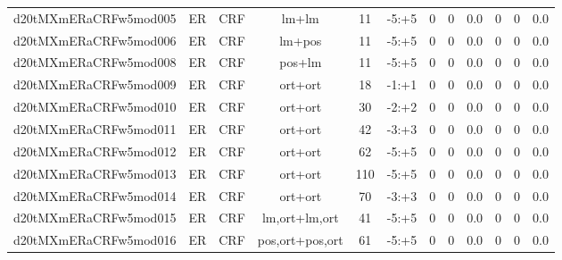 \documentclass[a4paper]{article}
\begin{document}
\begin{landscape}
\begin{center}
\begin{tabular}{ |c|c|c|c|c|c|c|c|c|c|c|c|}
 
 	
 	\small{ d20tMXmERaCRFw5mod005 } & ER & CRF & lm+lm  &  11 &  -5:+5  &  0 & 0 & 0.0  &  0 & 0 & 0.0 \\
 	

 
 	
 	\small{ d20tMXmERaCRFw5mod006 } & ER & CRF & lm+pos  &  11 &  -5:+5  &  0 & 0 & 0.0  &  0 & 0 & 0.0 \\
 	

 
 	
 	\small{ d20tMXmERaCRFw5mod008 } & ER & CRF & pos+lm  &  11 &  -5:+5  &  0 & 0 & 0.0  &  0 & 0 & 0.0 \\
 	

 
 	
 	\small{ d20tMXmERaCRFw5mod009 } & ER & CRF & ort+ort  &  18 &  -1:+1  &  0 & 0 & 0.0  &  0 & 0 & 0.0 \\
 	

 
 	
 	\small{ d20tMXmERaCRFw5mod010 } & ER & CRF & ort+ort  &  30 &  -2:+2  &  0 & 0 & 0.0  &  0 & 0 & 0.0 \\
 	

 
 	
 	\small{ d20tMXmERaCRFw5mod011 } & ER & CRF & ort+ort  &  42 &  -3:+3  &  0 & 0 & 0.0  &  0 & 0 & 0.0 \\
 	

 
 	
 	\small{ d20tMXmERaCRFw5mod012 } & ER & CRF & ort+ort  &  62 &  -5:+5  &  0 & 0 & 0.0  &  0 & 0 & 0.0 \\
 	

 
 	
 	\small{ d20tMXmERaCRFw5mod013 } & ER & CRF & ort+ort  &  110 &  -5:+5  &  0 & 0 & 0.0  &  0 & 0 & 0.0 \\
 	

 
 	
 	\small{ d20tMXmERaCRFw5mod014 } & ER & CRF & ort+ort  &  70 &  -3:+3  &  0 & 0 & 0.0  &  0 & 0 & 0.0 \\
 	

 
 	
 	\small{ d20tMXmERaCRFw5mod015 } & ER & CRF & lm,ort+lm,ort  &  41 &  -5:+5  &  0 & 0 & 0.0  &  0 & 0 & 0.0 \\
 	

 
 	
 	\small{ d20tMXmERaCRFw5mod016 } & ER & CRF & pos,ort+pos,ort  &  61 &  -5:+5  &  0 & 0 & 0.0  &  0 & 0 & 0.0 \\
 	

 
 	

\end{tabular}
\end{center}
\end{landscape}
\end{document}
